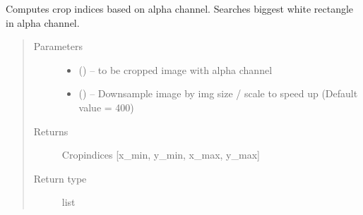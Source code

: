 \documentclass[letterpaper,10pt,english]{sphinxmanual}
\begin{document}
\begin{fulllineitems}
\label{\detokenize{image_helpers:image_helpers.get_crop_idx}}
Computes crop indices based on alpha channel.
Searches biggest white rectangle in alpha channel.
\begin{quote}\begin{description}
\item[{Parameters}] \leavevmode\begin{itemize}
\item {} 
 () -- to be cropped image with alpha channel

\item {} 
 () -- Downsample image by img size / scale to speed up (Default value = 400)

\end{itemize}

\item[{Returns}] \leavevmode
Cropindices {[}x\_min, y\_min, x\_max, y\_max{]}

\item[{Return type}] \leavevmode
list

\end{description}\end{quote}

\end{fulllineitems}

\end{document}
